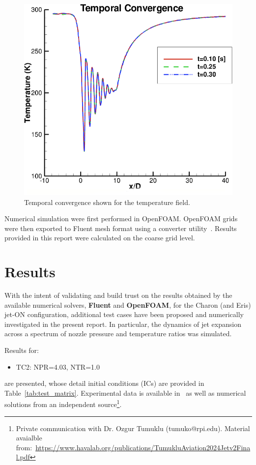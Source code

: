 \documentclass[12pt]{article}
\begin{document}
\begin{figure}[H]
    \centering
    \includegraphics[width=0.7\linewidth]{figs/f4.png}
    \caption{Temporal convergence shown for the temperature field.}
    \label{fig:convT}
\end{figure}

Numerical simulation were first performed in OpenFOAM. OpenFOAM grids were then exported to Fluent mesh format using a converter utility~\cite{chitalov2021developing}. Results provided in this report were calculated on the coarse grid level.

\section{Results}\label{sec:results}
With the intent of validating and build trust on the results obtained by the available numerical solvers, \textbf{Fluent} and \textbf{OpenFOAM}, for the Charon (and Eris) jet-ON configuration, additional test cases have been proposed and numerically investigated in the present report. In particular, the dynamics of jet expansion across a spectrum of nozzle pressure and temperature ratios was simulated.

Results for:
\begin{itemize}
    \item TC2: NPR=4.03, NTR=1.0
\end{itemize}
are presented, whose detail initial conditions (ICs) are provided in Table~\ref{tab:test_matrix}. Experimental data is available %
in~\cite{henderson2005experimental} as well as numerical solutions from an independent source\footnote{Private communication with Dr. Ozgur Tumuklu (tumuko@rpi.edu). Material avaialble from:~\url{https://www.havalab.org/publications/TumukluAviation2024Jetv2Final.pdf}}.
\end{document}
